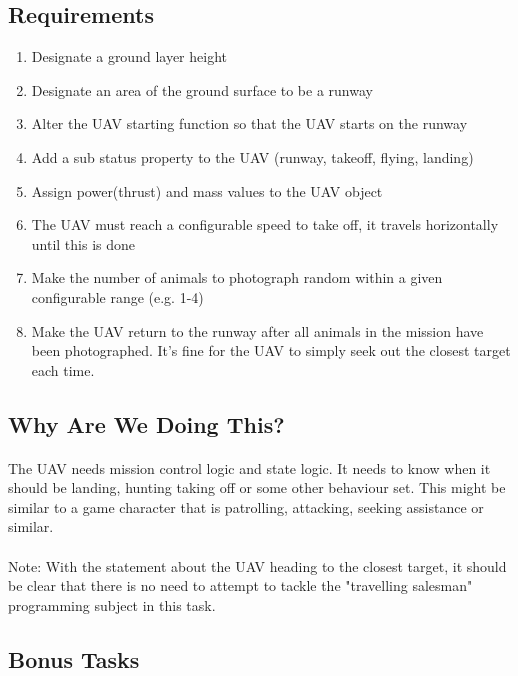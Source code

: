 \documentclass[11pt]{book}
\begin{document}
\subsection{Requirements}

\begin{enumerate}
\item Designate a ground layer height
\item Designate an area of the ground surface to be a runway
\item Alter the UAV starting function so that the UAV starts on the runway
\item Add a sub status property to the UAV (runway, takeoff, flying, landing)
\item Assign power(thrust) and mass values to the UAV object
\item The UAV must reach a configurable speed to take off, it travels horizontally until this is done
\item Make the number of animals to photograph random within a given configurable range (e.g. 1-4)
\item Make the UAV return to the runway after all animals in the mission have been photographed. It's fine for the UAV to simply seek out the closest target each time.
\end{enumerate}

\subsection{Why Are We Doing This?}

\paragraph{} The UAV needs mission control logic and state logic. It needs to know when it should be landing, hunting taking off or some other behaviour set. This might be similar to a game character that is patrolling, attacking, seeking assistance or similar.

\paragraph{} Note: With the statement about the UAV heading to the closest target, it should be clear that there is no need to attempt to tackle the "travelling salesman" programming subject in this task.

\subsection{Bonus Tasks}
\end{document}
